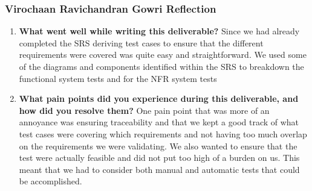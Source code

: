 \documentclass[12pt, titlepage]{article}
\begin{document}
\subsubsection*{Virochaan Ravichandran Gowri Reflection}
\begin{enumerate}
  \item \textbf{What went well while writing this deliverable?} 
  Since we had already completed the SRS deriving test cases to ensure that the different requirements were covered was quite easy and straightforward. We used some of the diagrams and components identified within the SRS to breakdown the functional system tests and for the NFR system tests 
  \item \textbf{What pain points did you experience during this deliverable, and how did you resolve them?}
  One pain point that was more of an annoyance was ensuring traceability and that we kept a good track of what test cases were covering which requirements and not having too much overlap on the requirements we were validating. We also wanted to ensure that the test were actually feasible and did not put too high of a burden on us. This meant that we had to consider both manual and automatic tests that could be accomplished. 
\end{enumerate}
\end{document}
